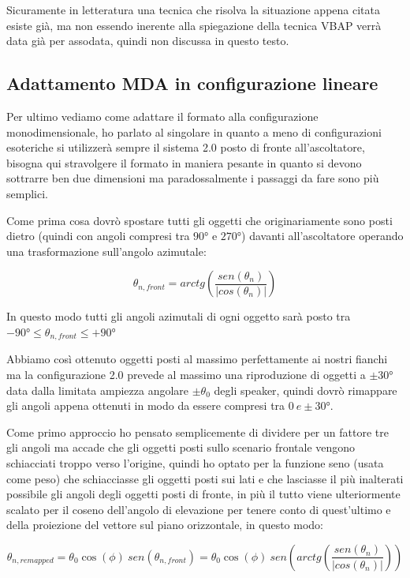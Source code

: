 \documentclass[12pt,a4paper]{report}
\begin{document}
Sicuramente in letteratura una tecnica che risolva la situazione appena citata esiste già, ma non essendo inerente alla spiegazione della tecnica VBAP verrà data già per assodata, quindi non discussa in questo testo.

\subsection{Adattamento MDA in configurazione lineare}

Per ultimo vediamo come adattare il formato alla configurazione monodimensionale, ho parlato al singolare in quanto a meno di configurazioni esoteriche si utilizzerà sempre il sistema 2.0 posto di fronte all'ascoltatore, bisogna qui stravolgere il formato in maniera pesante in quanto si devono sottrarre ben due dimensioni ma paradossalmente i passaggi da fare sono più semplici.

Come prima cosa dovrò spostare tutti gli oggetti che originariamente sono posti dietro (quindi con angoli compresi tra $90°$ e $270°$) davanti all'ascoltatore operando una trasformazione sull'angolo azimutale:

\begin{equation}
\theta_{n,front} = arctg  \left( \dfrac{sen(\theta_n)}{\vert cos(\theta_n)\vert } \right)
\label{llll}
\end{equation}

In questo modo tutti gli angoli azimutali di ogni oggetto sarà posto tra $-90° \leq \theta_{n,front} \leq +90°$

Abbiamo così ottenuto oggetti posti al massimo perfettamente ai nostri fianchi ma la configurazione 2.0 prevede al massimo una riproduzione di oggetti a $\pm 30°$ data dalla limitata ampiezza angolare $\pm \theta_0$ degli speaker, quindi dovrò rimappare gli angoli appena ottenuti in modo da essere compresi tra $0\ e \pm 30°$.

Come primo approccio ho pensato semplicemente di dividere per un fattore tre gli angoli ma accade che gli oggetti posti sullo scenario frontale vengono schiacciati troppo verso l'origine, quindi ho optato per la funzione seno (usata come peso) che schiacciasse gli oggetti posti sui lati e che lasciasse il più inalterati possibile gli angoli degli oggetti posti di fronte, in più il tutto viene ulteriormente scalato per il coseno dell'angolo di elevazione per tenere conto di quest'ultimo e della proiezione del vettore sul piano orizzontale, in questo modo:

\begin{equation}
\theta_{n, remapped}= \theta_0 \cos(\phi) \ sen (\theta_{n,front}) = \theta_0 \cos(\phi)\ sen \left( arctg  \left( \dfrac{sen(\theta_n)}{\vert cos(\theta_n)\vert } \right)\right)
\label{mmmm}
\end{equation}
\end{document}
